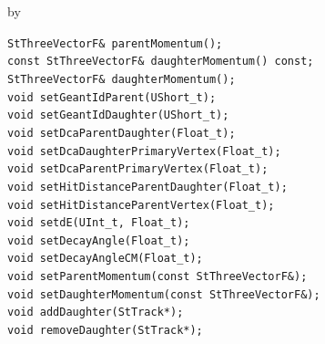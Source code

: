\documentclass[twoside]{article}
\newcommand{\entrylabel}[1]{\mbox{\textbf{{#1}}}\hfil}%
\newenvironment{entry}
{\begin{list}{}%
    {\renewcommand{\makelabel}{\entrylabel}%
     \setlength{\labelwidth}{90pt}%
     \setlength{\leftmargin}{\labelwidth}
     \advance\leftmargin by \labelsep%
      }%
    }%
  {\end{list}}
\newcommand{\Entrylabel}[1]%
{\raisebox{0pt}[1ex][0pt]{\makebox[\labelwidth][l]%
    {\parbox[t]{\labelwidth}{\hspace{0pt}\textbf{{#1}}}}}}
\newenvironment{Entry}%
{\renewcommand{\entrylabel}{\Entrylabel}\begin{entry}}%
  {\end{entry}}
\begin{document}
\begin{Entry}
    \verb+StThreeVectorF& parentMomentum();+\\
    \verb+const StThreeVectorF& daughterMomentum() const;+\\
    \verb+StThreeVectorF& daughterMomentum();+\\
    \verb+void setGeantIdParent(UShort_t);+\\
    \verb+void setGeantIdDaughter(UShort_t);+\\
    \verb+void setDcaParentDaughter(Float_t);+\\
    \verb+void setDcaDaughterPrimaryVertex(Float_t);+\\
    \verb+void setDcaParentPrimaryVertex(Float_t);+\\
    \verb+void setHitDistanceParentDaughter(Float_t);+\\
    \verb+void setHitDistanceParentVertex(Float_t);+\\
    \verb+void setdE(UInt_t, Float_t);+\\
    \verb+void setDecayAngle(Float_t);+\\
    \verb+void setDecayAngleCM(Float_t);+\\
    \verb+void setParentMomentum(const StThreeVectorF&);+\\
    \verb+void setDaughterMomentum(const StThreeVectorF&);+\\
    \verb+void addDaughter(StTrack*);+\\
    \verb+void removeDaughter(StTrack*);+\\
\end{Entry}
\clearpage
\end{document}
